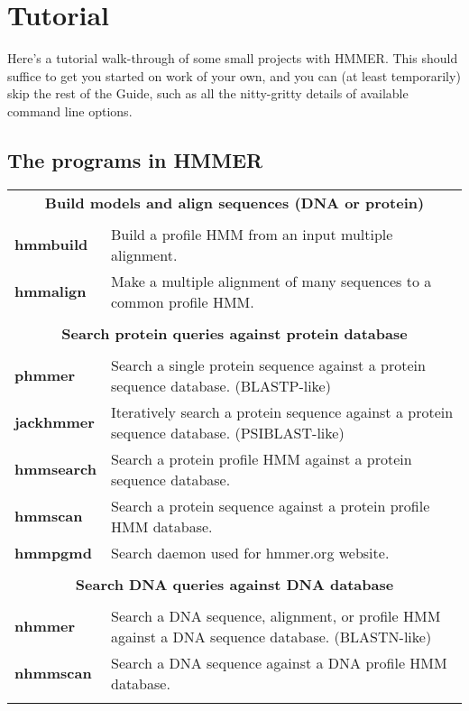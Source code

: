 
\section{Tutorial}
\label{section:tutorial}
\setcounter{footnote}{0}

Here's a tutorial walk-through of some small projects with
HMMER. This should suffice to get you started on work of your own,
and you can (at least temporarily) skip the rest of the Guide,
such as all the nitty-gritty details of available command line
options.

\subsection {The programs in HMMER}

\begin{tabular}{ll}

\multicolumn{2}{c}{\textbf{Build models and align sequences (DNA or protein)}}
\\ & \\ 
\textbf{hmmbuild}  & Build a profile HMM from an input multiple alignment.\\  
\textbf{hmmalign}  & Make a multiple alignment of many sequences to a common profile HMM.\\ 
& \\

\multicolumn{2}{c}{\textbf{Search protein queries against protein database}} \\ 
& \\ 
\textbf{phmmer}    & Search a single protein sequence against a protein sequence database. (BLASTP-like) \\
\textbf{jackhmmer} & Iteratively search a protein sequence against a protein sequence database. (PSIBLAST-like) \\ 
\textbf{hmmsearch} & Search a protein profile HMM against a protein sequence database.\\ 
\textbf{hmmscan}   & Search a protein sequence against a protein profile HMM database.\\
\textbf{hmmpgmd}   & Search daemon used for hmmer.org website.\\ 
& \\ 

\multicolumn{2}{c}{\textbf{Search DNA queries against DNA database}} \\ 
& \\ 
\textbf{nhmmer}    & Search a DNA sequence, alignment, or profile HMM against a DNA sequence database. (BLASTN-like)\\ 
\textbf{nhmmscan}  & Search a DNA sequence against a DNA profile HMM database.\\ 
& \\


\end{tabular}
